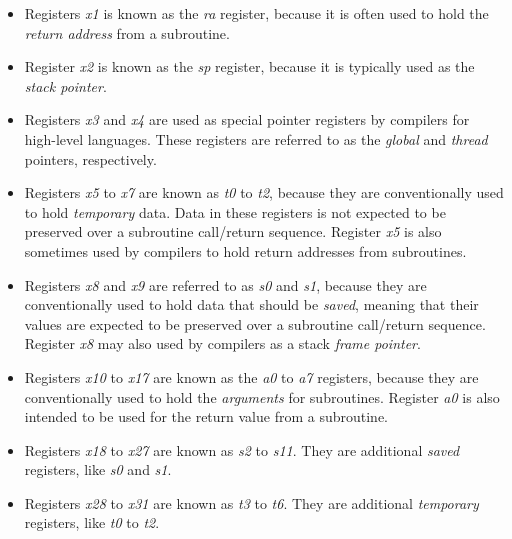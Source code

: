 \documentclass[11pt, twoside, pdftex]{article}
\begin{document}
\begin{itemize}
\item Registers {\it x1} is known as the {\it ra} register, because it is often used
to hold the {\it return address} from a subroutine. 
\item Register {\it x2} is known as the {\it sp} register, because it is typically used 
as the {\it stack pointer}. 
\item Registers {\it x3} and {\it x4} are used as special pointer registers by compilers
for high-level languages. These registers are referred to as the {\it global} and 
{\it thread} pointers, respectively. 
\item Registers {\it x5} to {\it x7} are known as {\it t0} to {\it t2}, because they are
conventionally used to hold {\it temporary} data. Data in these registers is not expected 
to be preserved over a subroutine call/return sequence. Register {\it x5} is also sometimes 
used by compilers to hold return addresses from subroutines.
\item Registers {\it x8} and {\it x9} are referred to as {\it s0} and {\it s1}, because 
they are conventionally used to hold data that should be {\it saved}, meaning that their 
values are expected to be preserved over a subroutine call/return sequence.
Register {\it x8} may also used by compilers as a stack {\it frame pointer}.
\item Registers {\it x10} to {\it x17} are known as the {\it a0} to {\it a7} registers, 
because they are conventionally used to hold the {\it arguments} for subroutines. 
Register {\it a0} is also intended to be used for the return value from a subroutine. 
\item Registers {\it x18} to {\it x27} are known as {\it s2} to {\it s11}. They are
additional {\it saved} registers, like {\it s0} and {\it s1}.
\item Registers {\it x28} to {\it x31} are known as {\it t3} to {\it t6}. They are
additional {\it temporary} registers, like {\it t0} to {\it t2}. 
\end{itemize}
\end{document}
